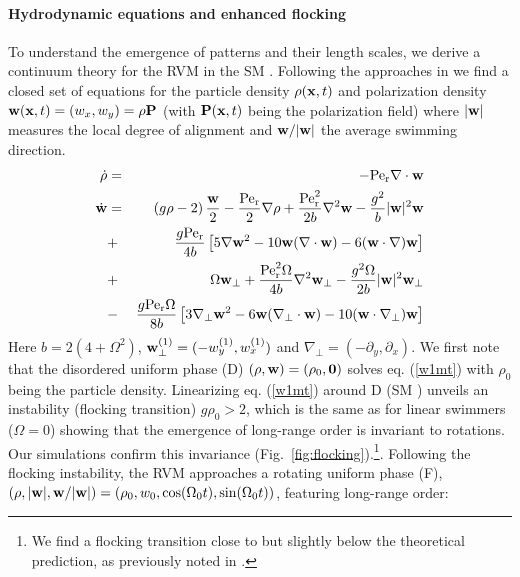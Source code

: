 \documentclass[aps,twocolumn,showlabels,showrefs,amsmath,amssymb,pre,superscriptaddress, floatfix, colors]{revtex4}
\newcommand{\1}{\begin{equation}}
\newcommand{\2}{\end{equation}}
\newcommand{\ea}{\begin{eqnarray}}
\newcommand{\ee}{\end{eqnarray}}
\newcommand{\4}[2]{{\frac{#1}{#2}}}
\begin{document}
\paragraph*{Hydrodynamic equations and enhanced flocking}
To understand the emergence of patterns and their length scales, we derive a continuum theory for the RVM in the SM \cite{SM}. 
Following the approaches in \cite{Dean1996,Bertin2009}
we find \cite{SM} a closed set of equations for the particle density $\rho({\bf x},t)$ and polarization density ${\bf w}({\bf x},t)=(w_x,w_y)=\rho {\bf P}$ (with $ {\bf P}({\bf x},t)$ being the polarization field)
where $|{\bf w}|$ measures the local degree of alignment and ${\bf w}/|{\bf w}|$ the average swimming direction. 
\ea
\dot \rho &=& -{\rm Pe}_{\rm r} \nabla \cdot {\bf w} \label{rho1}\\
\dot {\bf w}& =& \left(g \rho-2\right)\4{{\bf w}}{2} - \4{{\rm Pe}_{\rm r}}{2}\nabla \rho + \4{{\rm Pe}^2_{\rm r}}{2 b} \nabla^2 {\bf w} - \4{g^2}{b}|{\bf w}|^2{\bf w}  \label{w1mt}\\
&+& \4{g {\rm Pe}_{\rm r}}{4 b}\left[5\nabla {\bf w}^2 - 10{\bf w}(\nabla \cdot {\bf w}) -6 ({\bf w}\cdot \nabla){\bf w}\right] \nonumber \\
&+&\Omega {\bf w}_\perp  +\4{{\rm Pe}_{\rm r}^2 \Omega}{4b}\nabla^2 {\bf w}_\perp - \4{g^2 \Omega}{2 b}|{\bf w}|^2 {\bf w}_\perp \nonumber \\ 
&-& \4{g {\rm Pe}_{\rm r} \Omega}{8 b}\left[3\nabla_\perp {\bf w}^2 - 6{\bf w} (\nabla_\perp \cdot {\bf w}) - 10({\bf w} \cdot \nabla_\perp) {\bf w} \right] \nonumber 
\ee
Here $b=2(4+\Omega^2)$, ${\bf w}^{(1)}_\perp=(-w_y^{(1)},w_x^{(1)})$ and $\nabla_\perp=(-\partial_y,\partial_x)$.
We first note that the disordered uniform phase (D)
$(\rho,{\bf w})=(\rho_0,{\bf 0})$ solves eq. (\ref{w1mt}) with $\rho_0$ being the particle density. 
Linearizing eq. (\ref{w1mt}) around D (SM \cite{SM}) unveils an instability (flocking transition)
$g\rho_0>2$, which is the same as for linear swimmers ($\Omega=0$) showing that the emergence of long-range order is invariant to rotations. 
Our simulations confirm this invariance (Fig.~\ref{fig:flocking}).\footnote{We find a flocking transition close to but slightly below 
the theoretical prediction, as previously noted in \cite{Farrell2012}.}. 
Following the flocking instability, the RVM approaches a rotating uniform phase (F), $(\rho,|{\bf w}|,{\bf w}/|{\bf w}|)=(\rho_0,w_0,\cos(\Omega_0 t),\sin(\Omega_0 t))$, 
featuring long-range order:
\end{document}
